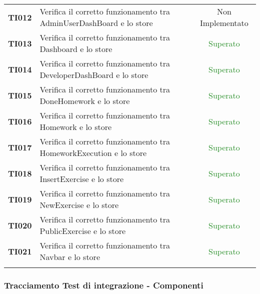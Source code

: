 \begin{tabularx}{\textwidth}{cXc}
\textbf{TI012} & Verifica il corretto funzionamento tra AdminUserDashBoard e lo store	& Non Implementato	\\
\textbf{TI013} & Verifica il corretto funzionamento tra Dashboard e lo store	 & \textcolor{ForestGreen}{Superato} \\
\textbf{TI014} & Verifica il corretto funzionamento tra DeveloperDashBoard e lo store	 & \textcolor{ForestGreen}{Superato} \\	
\textbf{TI015} & Verifica il corretto funzionamento tra DoneHomework e lo store	 & \textcolor{ForestGreen}{Superato} \\
\textbf{TI016} & Verifica il corretto funzionamento tra Homework e lo store	 & \textcolor{ForestGreen}{Superato} \\
\textbf{TI017} & Verifica il corretto funzionamento tra HomeworkExecution e lo store	 & \textcolor{ForestGreen}{Superato} \\
\textbf{TI018} & Verifica il corretto funzionamento tra InsertExercise e lo store	 & \textcolor{ForestGreen}{Superato} \\
\textbf{TI019} & Verifica il corretto funzionamento tra NewExercise e lo store	 & \textcolor{ForestGreen}{Superato} \\
\textbf{TI020} & Verifica il corretto funzionamento tra PublicExercise e lo store	 & \textcolor{ForestGreen}{Superato} \\
\textbf{TI021} & Verifica il corretto funzionamento tra Navbar e lo store	 & \textcolor{ForestGreen}{Superato} \\
				

	\rowcolor{white}
	\caption{Test di integrazione}
	\label{tab:tabellatestintegrazione}
\end{tabularx}


\subsubsection{Tracciamento Test di integrazione - Componenti}

